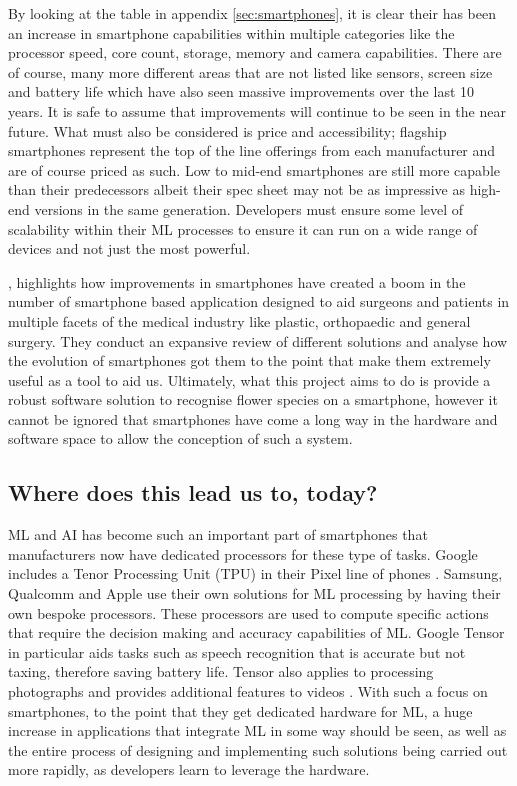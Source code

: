 \documentclass[12pt,a4paper]{report}
\begin{document}
By looking at the table in appendix \ref{sec:smartphones}, it is clear their has been an increase in 
smartphone capabilities within 
multiple categories like the processor speed, core count, 
storage, memory and camera capabilities. There are of course, many more different areas that are not listed like sensors, 
screen size and battery life which have also seen massive improvements over the last 10 years. It is safe to
assume that improvements will continue to be seen in the near future. 
What must also be considered is price and accessibility; flagship smartphones represent the top of the line offerings from
each manufacturer and are of course priced as such. Low to mid-end smartphones are still more capable 
than their predecessors albeit their spec sheet may not be as impressive as high-end versions in the same generation. 
Developers must ensure some level of scalability within their ML processes to ensure it can run on a wide range of
devices and not just the most powerful.

\par

\citet{kulendran2014}, highlights how improvements in smartphones have created a boom in the number of 
smartphone based application designed to aid surgeons and patients in multiple facets of the medical industry like 
plastic, orthopaedic and general surgery. They conduct an expansive review of different solutions and analyse how the 
evolution of smartphones got them to the point that make them extremely useful as a tool to aid us. Ultimately, what 
this project aims to do is provide a robust software solution to recognise flower species on a smartphone, however it
cannot be ignored that smartphones have come a long way in the hardware and software space to allow the
conception of such a system.

\subsection{Where does this lead us to, today?}

ML and AI has become such an important part of smartphones that manufacturers now have dedicated processors for these
type of tasks. Google includes a Tenor Processing Unit (TPU) in their Pixel line of phones \citep{triggs2021}. Samsung, 
Qualcomm and Apple use their own solutions for ML processing by having their own bespoke processors. These 
processors are used to compute specific actions that require the decision making and accuracy capabilities of ML.
Google Tensor in particular aids tasks such as speech recognition that is accurate but not taxing, therefore 
saving battery life. Tensor also applies to processing photographs and provides additional features to videos 
\citep{gupta2021}. With such a focus on smartphones, to the point that they get dedicated hardware for ML,
a huge increase in applications that integrate ML in some way should be seen, as well as the entire process of designing
and implementing such solutions being carried out more rapidly, as developers learn to leverage the hardware.
\end{document}
